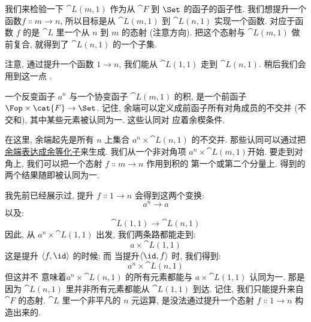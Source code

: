 我们来检验一下 $\cat{L}(m, 1)$ 作为从 $\cat{F}$ 到 $\Set$ 的函子的函子性.
我们想提升一个函数$f \Colon m \to n$, 所以目标是从 $\cat{L}(m, 1)$ 到 $\cat{L}(n, 1)$ 实现一个函数.
对应于函数 $f$ 的是 $\cat{L}$ 里一个从 $n$ 到 $m$ 的态射 (注意方向). 把这个态射与 $\cat{L}(m, 1)$
做前复合, 就得到了 $\cat{L}(n, 1)$ 的一个子集.

\begin{figure}[H]
  \centering
\end{figure}

\noindent
注意, 通过提升一个函数 $1 \to n$, 我们能从 $\cat{L}(1, 1)$ 走到 $\cat{L}(n, 1)$. 稍后我们会用到这一点
.

一个反变函子 $a^n$ 与一个协变函子 $\cat{L}(m, 1)$ 的积, 是一个前函子 $\Fop \times \cat{F} \to \Set$.
记住, 余端可以定义成前函子所有对角成员的不交并 (不交和), 其中某些元素被认同为一. 这些认同对
应着余楔条件.

在这里, 余端起先是所有 $n$ 上集合 $a^n \times \cat{L}(n, 1)$ 的不交并. 那些认同可以通过把
\hyperref[ends-and-coends]{余端表达成余等化子}来生成. 我们从一个非对角项
$a^n \times \cat{L}(m, 1)$开始. 要走到对角上, 我们可以把一个态射 $f \Colon m \to n$ 作用到积的
第一个或第二个分量上. 得到的两个结果随即被认同为一.

\begin{figure}[H]
  \centering
\end{figure}

\noindent
我先前已经展示过, 提升 $f \Colon 1 \to n$ 会得到这两个变换: \[a^n \to a\] 以及:
\[\cat{L}(1, 1) \to \cat{L}(n, 1)\] 因此, 从 $a^n \times \cat{L}(1, 1)$ 出发, 我们两条路都能走到:
\[a \times \cat{L}(1, 1)\] 这是提升 $\langle f, \id \rangle$ 的时候; 而
当提升$\langle \id, f \rangle$ 时, 我们得到: \[a^n \times \cat{L}(n, 1)\] 但这并不
意味着$a^n \times \cat{L}(n, 1)$ 的所有元素都能与 $a \times \cat{L}(1, 1)$ 认同为一. 那是因为
$\cat{L}(n, 1)$ 里并非所有元素都能从 $\cat{L}(1, 1)$ 到达. 记住, 我们只能提升来自 $\cat{F}$ 的态射.
$\cat{L}$ 里一个非平凡的 $n$ 元运算, 是没法通过提升一个态射 $f \Colon 1 \to n$ 构造出来的.

